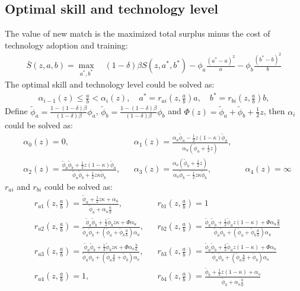 \documentclass[12pt]{article}
\newcommand{\1}{\mathbb{1}}
\begin{document}
\subsection{Optimal skill and technology level}
The value of new match is the maximized total surplus minus the cost of technology adoption and training: 
\begin{align*}
\bar{S}(z,a,b) = \max _{a^*,b^*} \quad (1-\delta)\beta S(z,a^*,b^*)-\phi_a\frac{(a^*-a)^2}{a}-\phi_b\frac{(b^*-b)^2}{b}
\end{align*}
The optimal skill and technology level could be solved as: 
\begin{align*}
\alpha_{i-1}(z) \leq \frac{a}{b}<\alpha_{i}(z), \quad a^*= r_{ai}(z,\frac{a}{b})a, \quad b^*= r_{bi}(z,\frac{a}{b})b, 
\end{align*}
Define $\tilde{\phi}_a = \frac{1-(1-\delta)\beta}{(1-\delta)\beta}\phi_a$, $\tilde{\phi}_b =\frac{1-(1-\delta)\beta}{(1-\delta)\beta}\phi_b$ and $\Phi(z) = \tilde{\phi}_a+\tilde{\phi}_b+\frac{1}{2}z$, then $\alpha_{i}$ could be solved as: 
\begin{align*}
&\alpha_0(z)= 0,
&&\alpha_1(z) = \frac{\alpha_u\tilde{\phi}_a-\frac{1}{2}z(1-\kappa)\tilde{\phi}_a}{\alpha_u(\tilde{\phi}_a+\frac{1}{2}z)},  \\
&\alpha_2(z) = \frac{\tilde{\phi}_a\tilde{\phi}_b+\frac{1}{2}z(1-\kappa)\tilde{\phi}_a}{\tilde{\phi}_a\tilde{\phi}_b+\frac{1}{2}z\kappa\tilde{\phi}_b},
&&\alpha_3(z) = \frac{\alpha_o(\tilde{\phi}_b+\frac{1}{2}z)}{\alpha_o\tilde{\phi}_b-\frac{1}{2}z\kappa\tilde{\phi}_b}, 
&&\alpha_4(z) = \infty 
\end{align*}
$r_{ai}$ and $r_{bi}$ could be solved as: 
\begin{align*}
&r_{a1}(z,\frac{a}{b}) = \frac{\tilde{\phi}_a+\frac{1}{2}z\kappa+\alpha_u}{\tilde{\phi}_a+\alpha_u\frac{a}{b}}, 
&&r_{b1}(z,\frac{a}{b})= 1\\
&r_{a2}(z,\frac{a}{b}) = \frac{\tilde{\phi}_a\tilde{\phi}_b+\frac{1}{2}\tilde{\phi}_bz\kappa+\Phi\alpha_u}{\tilde{\phi}_a\tilde{\phi}_b+(\tilde{\phi}_a+\tilde{\phi}_b\frac{a}{b})\alpha_u}, 
&&r_{b2}(z,\frac{a}{b})=  \frac{\tilde{\phi}_a\tilde{\phi}_b+\frac{1}{2}\tilde{\phi}_az(1-\kappa)+\Phi\alpha_u\frac{a}{b}}{\tilde{\phi}_a\tilde{\phi}_b+(\tilde{\phi}_a+\tilde{\phi}_b\frac{a}{b})\alpha_u}\\
&r_{a3}(z,\frac{a}{b}) = \frac{\tilde{\phi}_a\tilde{\phi}_b+\frac{1}{2}\tilde{\phi}_bz\kappa+\Phi\alpha_o\frac{b}{a}}{\tilde{\phi}_a\tilde{\phi}_b+(\tilde{\phi}_a\frac{b}{a}+\tilde{\phi}_b)\alpha_o}, 
&&r_{b3}(z,\frac{a}{b})=  \frac{\tilde{\phi}_a\tilde{\phi}_b+\frac{1}{2}\tilde{\phi}_az(1-\kappa)+\Phi\alpha_o}{\tilde{\phi}_a\tilde{\phi}_b+(\tilde{\phi}_a\frac{b}{a}+\tilde{\phi}_b)\alpha_o}\\
&r_{a4}(z,\frac{a}{b}) = 1, 
&&r_{b4}(z,\frac{a}{b})= \frac{\tilde{\phi}_b+\frac{1}{2}z(1-\kappa)+\alpha_o}{\tilde{\phi}_b+\alpha_o\frac{b}{a}}
\end{align*}
\end{document}
